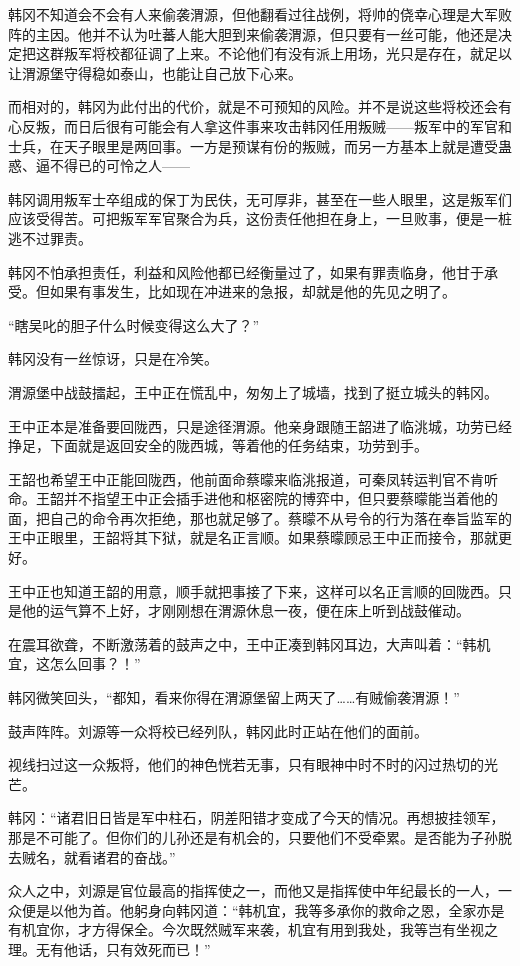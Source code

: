 韩冈不知道会不会有人来偷袭渭源，但他翻看过往战例，将帅的侥幸心理是大军败阵的主因。他并不认为吐蕃人能大胆到来偷袭渭源，但只要有一丝可能，他还是决定把这群叛军将校都征调了上来。不论他们有没有派上用场，光只是存在，就足以让渭源堡守得稳如泰山，也能让自己放下心来。

而相对的，韩冈为此付出的代价，就是不可预知的风险。并不是说这些将校还会有心反叛，而日后很有可能会有人拿这件事来攻击韩冈任用叛贼——叛军中的军官和士兵，在天子眼里是两回事。一方是预谋有份的叛贼，而另一方基本上就是遭受蛊惑、逼不得已的可怜之人——

韩冈调用叛军士卒组成的保丁为民伕，无可厚非，甚至在一些人眼里，这是叛军们应该受得苦。可把叛军军官聚合为兵，这份责任他担在身上，一旦败事，便是一桩逃不过罪责。

韩冈不怕承担责任，利益和风险他都已经衡量过了，如果有罪责临身，他甘于承受。但如果有事发生，比如现在冲进来的急报，却就是他的先见之明了。

“瞎吴叱的胆子什么时候变得这么大了？”

韩冈没有一丝惊讶，只是在冷笑。

渭源堡中战鼓擂起，王中正在慌乱中，匆匆上了城墙，找到了挺立城头的韩冈。

王中正本是准备要回陇西，只是途径渭源。他亲身跟随王韶进了临洮城，功劳已经挣足，下面就是返回安全的陇西城，等着他的任务结束，功劳到手。

王韶也希望王中正能回陇西，他前面命蔡曚来临洮报道，可秦凤转运判官不肯听命。王韶并不指望王中正会插手进他和枢密院的博弈中，但只要蔡曚能当着他的面，把自己的命令再次拒绝，那也就足够了。蔡曚不从号令的行为落在奉旨监军的王中正眼里，王韶将其下狱，就是名正言顺。如果蔡曚顾忌王中正而接令，那就更好。

王中正也知道王韶的用意，顺手就把事接了下来，这样可以名正言顺的回陇西。只是他的运气算不上好，才刚刚想在渭源休息一夜，便在床上听到战鼓催动。

在震耳欲聋，不断激荡着的鼓声之中，王中正凑到韩冈耳边，大声叫着：“韩机宜，这怎么回事？！”

韩冈微笑回头，“都知，看来你得在渭源堡留上两天了……有贼偷袭渭源！”

鼓声阵阵。刘源等一众将校已经列队，韩冈此时正站在他们的面前。

视线扫过这一众叛将，他们的神色恍若无事，只有眼神中时不时的闪过热切的光芒。

韩冈：“诸君旧日皆是军中柱石，阴差阳错才变成了今天的情况。再想披挂领军，那是不可能了。但你们的儿孙还是有机会的，只要他们不受牵累。是否能为子孙脱去贼名，就看诸君的奋战。”

众人之中，刘源是官位最高的指挥使之一，而他又是指挥使中年纪最长的一人，一众便是以他为首。他躬身向韩冈道：“韩机宜，我等多承你的救命之恩，全家亦是有机宜你，才方得保全。今次既然贼军来袭，机宜有用到我处，我等岂有坐视之理。无有他话，只有效死而已！”

